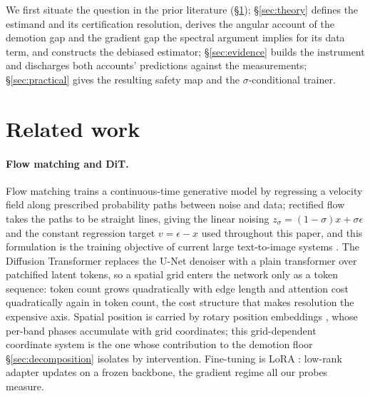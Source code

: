 We first situate the question in the prior literature
(\S\ref{sec:related}); \S\ref{sec:theory} defines the estimand and its
certification resolution, derives the angular account of the demotion
gap and the gradient gap the spectral argument implies for its data
term, and constructs the debiased estimator; \S\ref{sec:evidence}
builds the instrument and discharges both accounts' predictions
against the measurements;
\S\ref{sec:practical} gives the resulting safety map and the
$\sigma$-conditional trainer.

\section{Related work}
\label{sec:related}

\paragraph{Flow matching and DiT.}
Flow matching \citep{lipman2023flow} trains a continuous-time generative
model by regressing a velocity field along prescribed probability paths
between noise and data; rectified flow \citep{liu2023rectified} takes the
paths to be straight lines, giving the linear noising
$z_\sigma = (1-\sigma)x + \sigma\epsilon$ and the constant regression
target $v = \epsilon - x$ used throughout this paper, and this
formulation is the training objective of current large text-to-image
systems \citep{esser2024scaling}. The Diffusion Transformer
\citep{peebles2023dit} replaces the U-Net denoiser with a plain
transformer over patchified latent tokens, so a spatial grid enters the
network only as a token sequence: token count grows quadratically
with edge length and attention cost quadratically again in token count,
the cost structure that makes resolution the expensive axis. Spatial
position is carried by rotary position embeddings \citep{su2024roformer},
whose per-band phases accumulate with grid coordinates; this
grid-dependent coordinate system is the one whose contribution to the
demotion floor \S\ref{sec:decomposition} isolates by intervention. Fine-tuning is
LoRA \citep{hu2022lora}: low-rank adapter updates on a frozen backbone,
the gradient regime all our probes measure.

